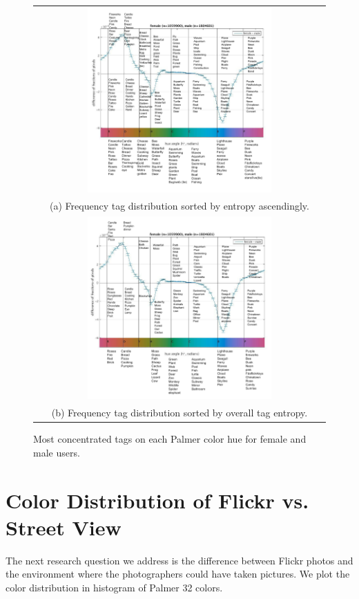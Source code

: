 \begin{figure}[th]
\centering
\begin{tabular}{c}
\includegraphics[width=0.65\textwidth]{figures/chapter3/tag1.png} \\
(a) Frequency tag distribution sorted by entropy ascendingly.\\
\includegraphics[width=0.65\textwidth]{figures/chapter3/tag2.png} \\
(b) Frequency tag distribution sorted by overall tag entropy.\\
\end{tabular}
\caption{Most concentrated tags on each Palmer color hue for female and male users.}
\label{fig:tag}
\end{figure}





\section{Color Distribution of Flickr vs. Street View}
The next research question we address is the difference between Flickr photos and the environment where the photographers could have taken pictures. 
We plot the color distribution in histogram of Palmer 32 colors.

